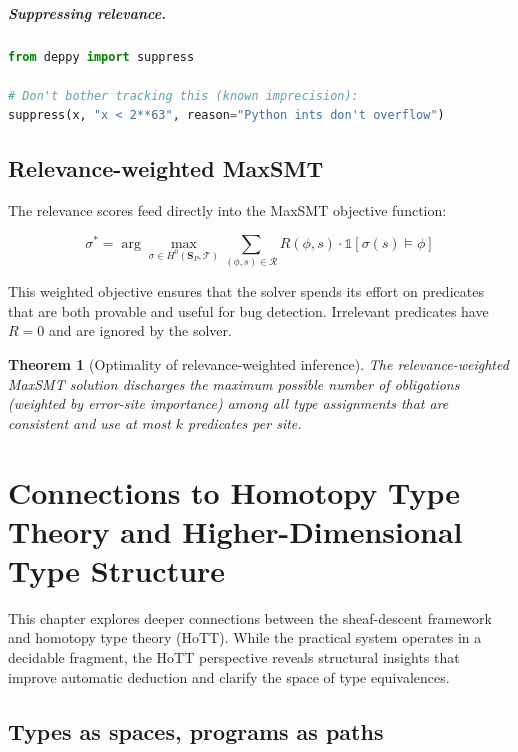 \documentclass[11pt]{report}
\theoremstyle{definition}
\theoremstyle{plain}
\newtheorem{theorem}[definition]{Theorem}
\begin{document}
\paragraph{Suppressing relevance.}
\begin{lstlisting}[style=deppy,language=Python]
from deppy import suppress

# Don't bother tracking this (known imprecision):
suppress(x, "x < 2**63", reason="Python ints don't overflow")
\end{lstlisting}

\section{Relevance-weighted MaxSMT}

The relevance scores feed directly into the MaxSMT objective function:

\[
  \sigma^* = \arg\max_{\sigma \in H^0(\mathbf{S}_P, \mathcal{T})}
    \sum_{(\phi, s) \in \mathcal{R}} R(\phi, s) \cdot
    \mathbb{1}[\sigma(s) \models \phi]
\]

This weighted objective ensures that the solver spends its effort on
predicates that are both provable and useful for bug detection. Irrelevant
predicates have $R = 0$ and are ignored by the solver.

\begin{theorem}[Optimality of relevance-weighted inference]
The relevance-weighted MaxSMT solution discharges the maximum possible
number of obligations (weighted by error-site importance) among all type
assignments that are consistent and use at most $k$ predicates per site.
\end{theorem}

\chapter{Connections to Homotopy Type Theory and Higher-Dimensional Type Structure}

This chapter explores deeper connections between the sheaf-descent framework
and homotopy type theory (HoTT). While the practical system operates in a
decidable fragment, the HoTT perspective reveals structural insights that
improve automatic deduction and clarify the space of type equivalences.

\section{Types as spaces, programs as paths}
\end{document}
